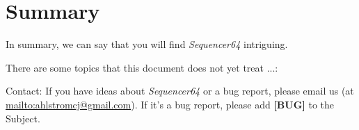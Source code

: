 \documentclass[
 11pt,
 twoside,
 a4paper,
 headinclude,
 footinclude,
 final                                 %
]{article}
\begin{document}

































\section{Summary}
\label{sec:summary}

   In summary, we can say that you will find \textsl{Sequencer64} intriguing.

   There are some topics that this document does not yet treat ...:

   Contact: If you have ideas about \textsl{Sequencer64} or a bug report, please
   email us (at \url{mailto:ahlstromcj@gmail.com}).
   If it's a bug report, please add \textbf{[BUG]} to the Subject.




\printindex
\end{document}
